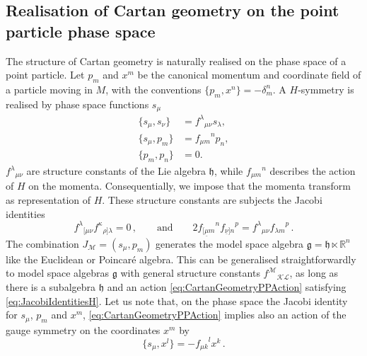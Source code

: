 \documentclass[11pt,a4paper]{article}
\numberwithin{equation}{section}
\begin{document}
\subsection{Realisation of Cartan geometry on the point particle phase space}\label{chap:PointParticle}
The structure of Cartan geometry is naturally realised on the phase space of a point particle. Let $p_m$ and $x^m$ be the canonical momentum and coordinate field of a particle moving in $M$, with the conventions $\{p_m , x^n \} = - \delta_m^n$. A $H$-symmetry is realised by phase space functions $s_\mu$
\begin{align}
    \{ s_\mu , s_\nu \} &= {f^\lambda}_{\mu \nu} s_\lambda , \label{eq:CartanGeometryPPGauge}\\
    \{ s_\mu , p_m \} &= {f_{\mu m }}^n p_n, \label{eq:CartanGeometryPPAction} \\
   \{ p_m , p_n \} &= 0. \label{eq:CartanGeometryPPMomenta}
\end{align}
${f^\lambda}_{\mu \nu}$ are structure constants of the Lie algebra $\mathfrak{h}$, while ${f_{\mu m}}^n$ describes the action of $H$ on the momenta. Consequentially, we impose that the momenta transform as representation of $H$. These structure constants are subjects the Jacobi identities 
\begin{equation}
    {f^\lambda}_{[\mu \nu} {f^\kappa}_{\rho] \lambda}= 0\,, 
      \qquad \text{and} \qquad
    2 {f_{[\underline{\mu} m}}^n {f_{\underline{\nu}] n}}^p = {f^\lambda}_{\mu \nu}{f_{\lambda m}}^p\,. \label{eq:JacobiIdentitiesH}
\end{equation}
The combination $J_{\mathcal{M}} = (s_\mu , p_m)$ generates the model space algebra $\mathfrak{g} = \mathfrak{h} \ltimes \mathbb{R}^{n}$ like the Euclidean or Poincar\'e algebra. This can be generalised straightforwardly to model space algebras $\mathfrak{g}$ with general structure constants ${f^{\mathcal{M}}}_{\mathcal{KL}}$, as long as there is a subalgebra $\mathfrak{h}$ and an action \eqref{eq:CartanGeometryPPAction} satisfying \eqref{eq:JacobiIdentitiesH}. Let us note that, on the phase space the Jacobi identity for $s_\mu$, $p_m$ and $x^m$, \eqref{eq:CartanGeometryPPAction} implies also an action of the gauge symmetry on the coordinates $x^m$ by 
\begin{equation}\label{eq:Salphaxl}
  \{ s_\mu , x^l\} = - {f_{\mu k}}^l x^k \,.
\end{equation}
\end{document}
